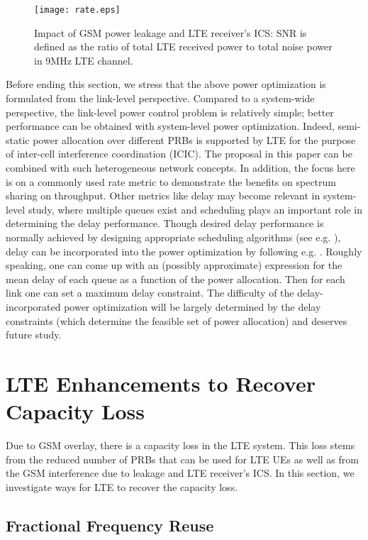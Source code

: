\documentclass[10pt,journal]{IEEEtran}
\theoremstyle{slplain}
\begin{document}
\begin{figure}
\centering
\texttt{[image: rate.eps]}
\caption{Impact of GSM power leakage and LTE receiver's ICS: SNR is defined as the ratio of total LTE received power to total noise power in 9MHz LTE channel.}
\label{fig:13}
\end{figure}




Before ending this section, we stress that the above power optimization is formulated from the link-level perspective. Compared to a system-wide perspective, the link-level power control problem is relatively simple; better performance can be obtained with system-level power optimization. Indeed, semi-static power allocation over different PRBs is supported by LTE for the purpose of inter-cell interference coordination (ICIC). The proposal in this paper can be combined with such heterogeneous network concepts. In addition, the focus here is on a commonly used rate metric to demonstrate the benefits on spectrum sharing on throughput. Other metrics like delay may become relevant in system-level study, where multiple queues exist and scheduling plays an important role in determining the delay performance. Though desired delay performance is normally achieved by designing appropriate scheduling algorithms (see e.g. \cite{parekh1993generalized, fattah2002overview, liu2006cross}), delay can be incorporated into the power optimization by following e.g. \cite{li2009optimal}. Roughly speaking, one can come up with an (possibly approximate) expression for the mean delay of each queue as a function of the power allocation. Then for each link one can set a maximum delay constraint. The difficulty of the delay-incorporated power optimization will be largely determined by the delay constraints (which determine the feasible set of power allocation) and deserves future study.


\section{LTE Enhancements to Recover Capacity Loss}
\label{sec:lte}

Due to GSM overlay, there is a capacity  loss in the LTE system. This loss stems from the reduced number of PRBs that can be used for LTE UEs as well as from the GSM interference due to leakage and LTE receiver's ICS. In this section, we investigate ways for LTE to recover the capacity loss.


\subsection{Fractional Frequency Reuse}
\end{document}
